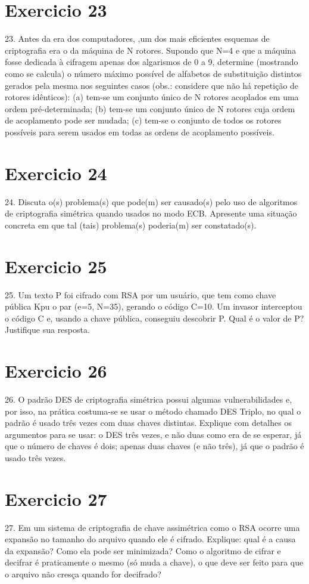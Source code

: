 \documentclass[10pt,a4paper]{article}
\begin{document}
\section*{Exercicio 23}
23. Antes da era dos computadores, ,um dos mais eficientes esquemas de criptografia era o da máquina de N rotores. Supondo que N=4 e que a máquina fosse dedicada à cifragem apenas dos algarismos de 0 a 9, determine (mostrando como se calcula) o número máximo possível de alfabetos de substituição distintos gerados pela mesma nos seguintes casos (obs.: considere que não há repetição de rotores idênticos):
(a) tem-se um conjunto único de N rotores acoplados em uma ordem pré-determinada;
(b) tem-se um conjunto único de N rotores cuja ordem de acoplamento pode ser mudada;
(c) tem-se o conjunto de todos os rotores possíveis para serem usados em todas as ordens de acoplamento possíveis.
\section*{Exercicio 24}
24. Discuta o(s) problema(s) que pode(m) ser causado(s) pelo uso de algoritmos de criptografia simétrica quando usados no modo ECB. Apresente uma situação concreta em que tal (tais) problema(s) poderia(m) ser constatado(s).
\section*{Exercicio 25}
25. Um texto P foi cifrado com RSA por um usuário, que tem como chave pública Kpu o par (e=5, N=35), gerando o código C=10. Um invasor interceptou o código C e, usando a chave pública, conseguiu descobrir P. Qual é o valor de P? Justifique sua resposta.
\section*{Exercicio 26}
26. O padrão DES de criptografia simétrica possui algumas vulnerabilidades e, por isso, na prática costuma-se se usar o método chamado DES Triplo, no qual o padrão é usado três vezes com duas chaves distintas. Explique com detalhes os argumentos para se usar:
o DES três vezes, e não duas como era de se esperar, já que o número de chaves é dois;
apenas duas chaves (e não três), já que o padrão é usado três vezes.
\section*{Exercicio 27}
27. Em um sistema de criptografia de chave assimétrica como o RSA ocorre uma expansão no tamanho do arquivo quando ele é cifrado. Explique:
qual é a causa da expansão?
Como ela pode ser minimizada?
Como o algoritmo de cifrar e decifrar é praticamente o mesmo (só muda a chave), o que deve ser feito para que o arquivo não cresça quando for decifrado?
\end{document}
